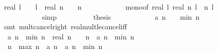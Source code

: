 \begin{isabellebody}
\ {\isachardoublequoteopen}{\isacharparenleft}real\ l\ {\isacharminus}\ {}{\isacharparenright}\ {\isacharslash}\ l\ {\isasymle}\ {\isacharparenleft}real\ n\ {\isacharminus}\ {}{\isacharparenright}\ {\isacharslash}\ n{\isachardoublequoteclose}\isanewline
\ \ \ \ \ \ \ \ \ \ \isamarkupfalse%
\ mono{\isacharbrackleft}of\ {\isachardoublequoteopen}real\ l{\isachardoublequoteclose}\ {\isachardoublequoteopen}real\ n{\isachardoublequoteclose}{\isacharbrackright}\ {\isacharbackquoteopen}l\ {\isasymle}\ n{\isacharbackquoteclose}\ {\isacharbackquoteopen}l\ {\isasymge}\ {}{\isacharbackquoteclose}\isanewline
\ \ \ \ \ \ \ \ \ \ \isamarkupfalse%
\ simp\isanewline
\ \ \ \ \ \ \ \ \isamarkupfalse%
\ {\isacharquery}thesis\isanewline
\ \ \ \ \ \ \ \ \ \ \isamarkupfalse%
\ {\isacharbackquoteopen}a\ {\isacharparenleft}n\ {\isacharminus}\ {}{\isacharparenright}\ {\isasymge}\ {\isacharquery}min\ {\isacharparenleft}n{\isacharminus}{}{\isacharparenright}{\isacharbackquoteclose}\isanewline
\ \ \ \ \ \ \ \ \ \ \isamarkupfalse%
\ {\isacharparenleft}smt\ mult{\isacharunderscore}cancel{\isacharunderscore}right\ real{\isacharunderscore}mult{\isacharunderscore}le{\isacharunderscore}cancel{\isacharunderscore}iff{}{\isacharparenright}\isanewline
\ \ \ \ \ \ \isamarkupfalse%
\isanewline
\ \ \ \ \ \ \isamarkupfalse%
\isanewline
\ \ \ \ \ \ \isamarkupfalse%
\ {}{\isacharcolon}\ {\isachardoublequoteopen}a\ {\isacharparenleft}n{\isacharminus}{}{\isacharparenright}\ {\isacharminus}\ {\isacharquery}min\ n\ {\isasymle}\ {\isacharparenleft}real\ n\ {\isacharminus}\ {}{\isacharparenright}\ {\isacharslash}\ n\ {\isacharasterisk}\ {\isacharparenleft}a\ {\isacharparenleft}n{\isacharminus}{}{\isacharparenright}\ {\isacharminus}\ {\isacharquery}min\ {\isacharparenleft}n{\isacharminus}{}{\isacharparenright}{\isacharparenright}{\isachardoublequoteclose}\isanewline
\ \ \ \ \ \ \ \ \isacommand{{\isachardot}}\isamarkupfalse%
\isanewline
\isanewline
\ \ \ \ \ \ \isamarkupfalse%
\ {\isachardoublequoteopen}{\isacharquery}{\isasymDelta}\ n\ {\isacharequal}\ {\isacharparenleft}{\isacharquery}max\ n\ {\isacharminus}\ a\ {\isacharparenleft}n{\isacharminus}{}{\isacharparenright}{\isacharparenright}\ {\isacharplus}\ {\isacharparenleft}a\ {\isacharparenleft}n{\isacharminus}{}{\isacharparenright}\ {\isacharminus}\ {\isacharquery}min\ n{\isacharparenright}{\isachardoublequoteclose}\isanewline

\end{isabellebody}
